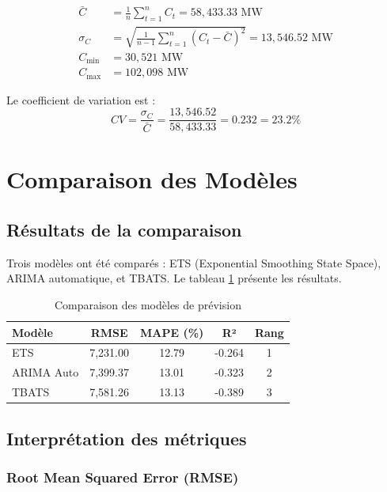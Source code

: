 \documentclass[12pt,a4paper]{article}
\begin{document}
\begin{align}
    \bar{C} &= \frac{1}{n}\sum_{t=1}^{n} C_t = 58,433.33 \text{ MW} \\
    \sigma_C &= \sqrt{\frac{1}{n-1}\sum_{t=1}^{n}(C_t - \bar{C})^2} = 13,546.52 \text{ MW} \\
    C_{\min} &= 30,521 \text{ MW} \\
    C_{\max} &= 102,098 \text{ MW}
\end{align}

Le coefficient de variation est :
\begin{equation}
    CV = \frac{\sigma_C}{\bar{C}} = \frac{13,546.52}{58,433.33} = 0.232 = 23.2\%
\end{equation}

\section{Comparaison des Modèles}

\subsection{Résultats de la comparaison}

Trois modèles ont été comparés : ETS (Exponential Smoothing State Space), ARIMA automatique, et TBATS. Le tableau \ref{tab:comparaison} présente les résultats.

\begin{table}[h]
\centering
\caption{Comparaison des modèles de prévision}
\label{tab:comparaison}
\begin{tabular}{lcccc}
\toprule
\textbf{Modèle} & \textbf{RMSE} & \textbf{MAPE (\%)} & \textbf{R²} & \textbf{Rang} \\
\midrule
ETS & 7,231.00 & 12.79 & -0.264 & 1 \\
ARIMA Auto & 7,399.37 & 13.01 & -0.323 & 2 \\
TBATS & 7,581.26 & 13.13 & -0.389 & 3 \\
\bottomrule
\end{tabular}
\end{table}

\subsection{Interprétation des métriques}

\subsubsection{Root Mean Squared Error (RMSE)}
\end{document}
